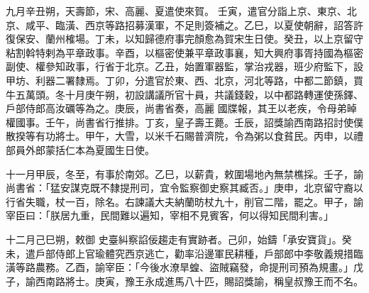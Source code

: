 \begin{pinyinscope}
 九月辛丑朔，天壽節，宋、高麗、夏遣使來賀。
 壬寅，遣官分詣上京、東京、北京、咸平、臨潢、西京等路招募漢軍，不足則簽補之。乙巳，以夏使朝辭，詔答許復保安、蘭州榷場。丁未，以知歸德府事完顏愈為賀宋生日使。癸丑，以上京留守粘割斡特剌為平章政事。辛酉，以樞密使兼平章政事襄，知大興府事胥持國為樞密副使、權參知政事，行省于北京。乙丑，始置軍器監，掌治戎器，班少府監下，設甲坊、利器二署隸焉。丁卯，分遣官於東、西、北京，河北等路，中都二節鎮，買牛五萬頭。冬十月庚午朔，初設講議所官十員，共議錢穀，以中都路轉運使孫鐸、戶部侍郎高汝礪等為之。庚辰，尚書省奏，高麗
 國牒報，其王以老疾，令母弟晫權國事。壬午，尚書省行推排。丁亥，皇子壽王薨。壬辰，詔獎諭西南路招討使僕散揆等有功將士。甲午，大雪，以米千石賜普濟院，令為粥以食貧民。丙申，以禮部員外郎蒙括仁本為夏國生日使。



 十一月甲辰，冬至，有事於南郊。乙巳，以薪貴，敕圍場地內無禁樵採。壬子，諭尚書省：「猛安謀克既不隸提刑司，宜令監察御史察其臧否。」庚申，北京留守裔以行省失職，杖一百，除名。右諫議大夫納蘭昉杖九十，削官二階，罷之。甲子，諭宰臣曰：「朕居九重，民間難以遍知，宰相不見賓客，何以得知民間利害。」



 十二月己巳朔，敕御
 史臺糾察諂佞趨走有實跡者。己卯，始鑄「承安寶貨」。癸未，遣戶部侍郎上官瑜體究西京逃亡，勸率沿邊軍民耕種，戶部郎中李敬義規措臨潢等路農務。乙酉，諭宰臣：「今後水潦旱蝗、盜賊竊發，命提刑司預為規畫。」戊子，諭西南路將士。庚寅，豫王永成進馬八十匹，賜詔獎諭，稱皇叔豫王而不名。



\end{pinyinscope}
